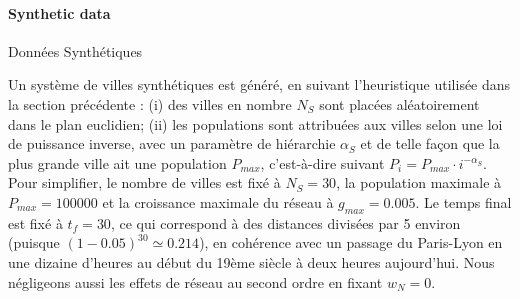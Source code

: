 

\paragraph{Synthetic data}{Données Synthétiques}


Un système de villes synthétiques est généré, en suivant l'heuristique utilisée dans la section précédente : (i) des villes en nombre $N_S$ sont placées aléatoirement dans le plan euclidien; (ii) les populations sont attribuées aux villes selon une loi de puissance inverse, avec un paramètre de hiérarchie $\alpha_S$ et de telle façon que la plus grande ville ait une population $P_{max}$, c'est-à-dire suivant $P_i = P_{max} \cdot i^{-\alpha_S}$. Pour simplifier, le nombre de villes est fixé à $N_S = 30$, la population maximale à $P_{max} = 100000$ et la croissance maximale du réseau à $g_{max} = 0.005$. Le temps final est fixé à $t_f = 30$, ce qui correspond à des distances divisées par 5 environ (puisque $(1 - 0.05)^{30} \simeq 0.214$), en cohérence avec un passage du Paris-Lyon en une dizaine d'heures au début du 19ème siècle à deux heures aujourd'hui. Nous négligeons aussi les effets de réseau au second ordre en fixant $w_N = 0$.


